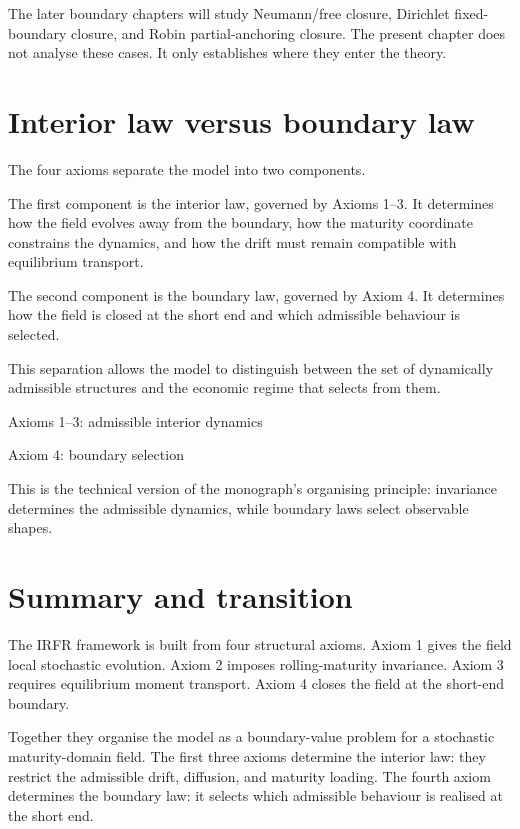 \documentclass[11pt,oneside]{book}
\begin{document}
The later boundary chapters will study Neumann/free closure, Dirichlet
fixed-boundary closure, and Robin partial-anchoring closure. The present
chapter does not analyse these cases. It only establishes where they
enter the theory.

\section{Interior law versus boundary
law}\label{interior-law-versus-boundary-law}

The four axioms separate the model into two components.

The first component is the interior law, governed by Axioms 1--3. It
determines how the field evolves away from the boundary, how the
maturity coordinate constrains the dynamics, and how the drift must
remain compatible with equilibrium transport.

The second component is the boundary law, governed by Axiom 4. It
determines how the field is closed at the short end and which admissible
behaviour is selected.

This separation allows the model to distinguish between the set of
dynamically admissible structures and the economic regime that selects
from them.

Axioms 1--3: admissible interior dynamics

Axiom 4: boundary selection

This is the technical version of the monograph's organising principle:
invariance determines the admissible dynamics, while boundary laws
select observable shapes.

\section{Summary and transition}\label{summary-and-transition}

The IRFR framework is built from four structural axioms. Axiom 1 gives
the field local stochastic evolution. Axiom 2 imposes rolling-maturity
invariance. Axiom 3 requires equilibrium moment transport. Axiom 4
closes the field at the short-end boundary.

Together they organise the model as a boundary-value problem for a
stochastic maturity-domain field. The first three axioms determine the
interior law: they restrict the admissible drift, diffusion, and
maturity loading. The fourth axiom determines the boundary law: it
selects which admissible behaviour is realised at the short end.
\end{document}
